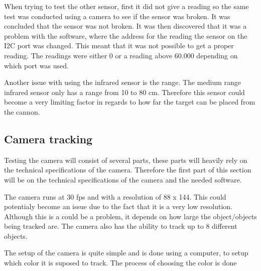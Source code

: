 When trying to test the other sensor, first it did not give a reading so the
same test was conducted using a camera to see if the sensor was broken. It was
concluded that the sensor was not broken. It was then discovered that it was a
problem with the software, where the address for the reading the sensor on the
I2C port was changed. This meant that it was not possible to get a proper
reading. The readings were either 0 or a reading above 60.000 depending on which
port was used. \nl

Another issue with using the infrared sensor is the range. The medium range
infrared sensor only has a range from 10 to 80 cm. Therefore this sensor could
become a very limiting factor in regards to how far the target can be placed
from the cannon. 

\subsection{Camera tracking}%
Testing the camera will consist of several parts, these parts will heavily rely
on the technical specifications of the camera. Therefore the first part of this
section will be on the technical specifications of the camera and the needed
software.\nl

The camera runs at 30 fps and with a resolution of 88 x 144. This could
potentialy become an issue due to the fact that it is a very low resolution.
Although this is a could be a problem, it depends on how large the
object/objects being tracked are.
The camera also has the ability to track up to 8 different objects. \nl

The setup of the camera is quite simple and is done using a computer, to setup
which color it is suposed to track. The process of choosing the color is done 
